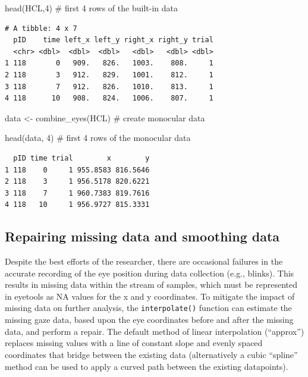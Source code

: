 \documentclass[
  man,
  floatsintext,
  longtable,
  nolmodern,
  notxfonts,
  notimes,
  colorlinks=true,linkcolor=blue,citecolor=blue,urlcolor=blue]{apa7}
\newenvironment{Shaded}{\begin{snugshade}}{\end{snugshade}}
\newcommand{\CommentTok}[1]{\textcolor[rgb]{0.37,0.37,0.37}{#1}}
\newcommand{\DecValTok}[1]{\textcolor[rgb]{0.68,0.00,0.00}{#1}}
\newcommand{\FunctionTok}[1]{\textcolor[rgb]{0.28,0.35,0.67}{#1}}
\newcommand{\NormalTok}[1]{\textcolor[rgb]{0.00,0.23,0.31}{#1}}
\newcommand{\OtherTok}[1]{\textcolor[rgb]{0.00,0.23,0.31}{#1}}
\begin{document}
\begin{Shaded}
\begin{Highlighting}[]
\FunctionTok{head}\NormalTok{(HCL,}\DecValTok{4}\NormalTok{) }\CommentTok{\# first 4 rows of the built{-}in data}
\end{Highlighting}
\end{Shaded}

\begin{verbatim}
# A tibble: 4 x 7
  pID    time left_x left_y right_x right_y trial
  <chr> <dbl>  <dbl>  <dbl>   <dbl>   <dbl> <dbl>
1 118       0   909.   826.   1003.    808.     1
2 118       3   912.   829.   1001.    812.     1
3 118       7   912.   826.   1010.    813.     1
4 118      10   908.   824.   1006.    807.     1
\end{verbatim}

\begin{Shaded}
\begin{Highlighting}[]
\NormalTok{data }\OtherTok{\textless{}{-}} \FunctionTok{combine\_eyes}\NormalTok{(HCL) }\CommentTok{\# create monocular data }

\FunctionTok{head}\NormalTok{(data, }\DecValTok{4}\NormalTok{) }\CommentTok{\# first 4 rows of the monocular data}
\end{Highlighting}
\end{Shaded}

\begin{verbatim}
  pID time trial        x        y
1 118    0     1 955.8583 816.5646
2 118    3     1 956.5178 820.6221
3 118    7     1 960.7383 819.7616
4 118   10     1 956.9727 815.3331
\end{verbatim}

\subsection{Repairing missing data and smoothing
data}\label{repairing-missing-data-and-smoothing-data}

Despite the best efforts of the researcher, there are occasional
failures in the accurate recording of the eye position during data
collection (e.g., blinks). This results in missing data within the
stream of samples, which must be represented in eyetools as NA values
for the x and y coordinates. To mitigate the impact of missing data on
further analysis, the \texttt{interpolate()} function can estimate the
missing gaze data, based upon the eye coordinates before and after the
missing data, and perform a repair. The default method of linear
interpolation (``approx'') replaces missing values with a line of
constant slope and evenly spaced coordinates that bridge between the
existing data (alternatively a cubic ``spline'' method can be used to
apply a curved path between the existing datapoints).
\end{document}
